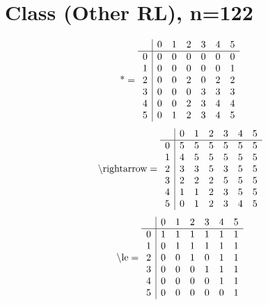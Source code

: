 \documentclass[11pt]{article}
\begin{document}
\section{Class (Other RL), n=122}
\[\text{*} = 
\begin{array}{r | r r r r r r}
 & 0 & 1 & 2 & 3 & 4 & 5 \\ \hline
0 & 0 & 0 & 0 & 0 & 0 & 0 \\
1 & 0 & 0 & 0 & 0 & 0 & 1 \\
2 & 0 & 0 & 2 & 0 & 2 & 2 \\
3 & 0 & 0 & 0 & 3 & 3 & 3 \\
4 & 0 & 0 & 2 & 3 & 4 & 4 \\
5 & 0 & 1 & 2 & 3 & 4 & 5 \\
\end{array}
\]
\[\text{\textbackslash rightarrow} = 
\begin{array}{r | r r r r r r}
 & 0 & 1 & 2 & 3 & 4 & 5 \\ \hline
0 & 5 & 5 & 5 & 5 & 5 & 5 \\
1 & 4 & 5 & 5 & 5 & 5 & 5 \\
2 & 3 & 3 & 5 & 3 & 5 & 5 \\
3 & 2 & 2 & 2 & 5 & 5 & 5 \\
4 & 1 & 1 & 2 & 3 & 5 & 5 \\
5 & 0 & 1 & 2 & 3 & 4 & 5 \\
\end{array}
\]
\[\text{\textbackslash le} = 
\begin{array}{r | r r r r r r}
 & 0 & 1 & 2 & 3 & 4 & 5 \\ \hline
0 & 1 & 1 & 1 & 1 & 1 & 1 \\
1 & 0 & 1 & 1 & 1 & 1 & 1 \\
2 & 0 & 0 & 1 & 0 & 1 & 1 \\
3 & 0 & 0 & 0 & 1 & 1 & 1 \\
4 & 0 & 0 & 0 & 0 & 1 & 1 \\
5 & 0 & 0 & 0 & 0 & 0 & 1 \\
\end{array}
\]
\end{document}
